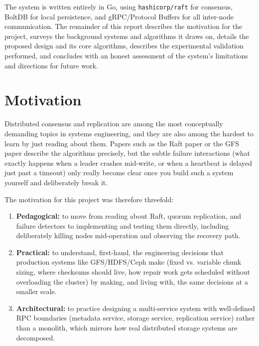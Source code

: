 \documentclass[12pt,a4paper]{report}
\begin{document}
The system is written entirely in Go, using \texttt{hashicorp/raft} for consensus, BoltDB for local persistence, and gRPC/Protocol Buffers for all inter-node communication. The remainder of this report describes the motivation for the project, surveys the background systems and algorithms it draws on, details the proposed design and its core algorithms, describes the experimental validation performed, and concludes with an honest assessment of the system's limitations and directions for future work.

\chapter{Motivation}

Distributed consensus and replication are among the most conceptually demanding topics in systems engineering, and they are also among the hardest to learn by just reading about them. Papers such as the Raft paper or the GFS paper describe the algorithms precisely, but the subtle failure interactions (what exactly happens when a leader crashes mid-write, or when a heartbeat is delayed just past a timeout) only really become clear once you build such a system yourself and deliberately break it.

The motivation for this project was therefore threefold:

\begin{enumerate}[nosep]
    \item \textbf{Pedagogical:} to move from reading about Raft, quorum replication, and failure detectors to implementing and testing them directly, including deliberately killing nodes mid-operation and observing the recovery path.
    \item \textbf{Practical:} to understand, first-hand, the engineering decisions that production systems like GFS/HDFS/Ceph make (fixed vs. variable chunk sizing, where checksums should live, how repair work gets scheduled without overloading the cluster) by making, and living with, the same decisions at a smaller scale.
    \item \textbf{Architectural:} to practice designing a multi-service system with well-defined RPC boundaries (metadata service, storage service, replication service) rather than a monolith, which mirrors how real distributed storage systems are decomposed.
    \end{enumerate}
\end{document}
